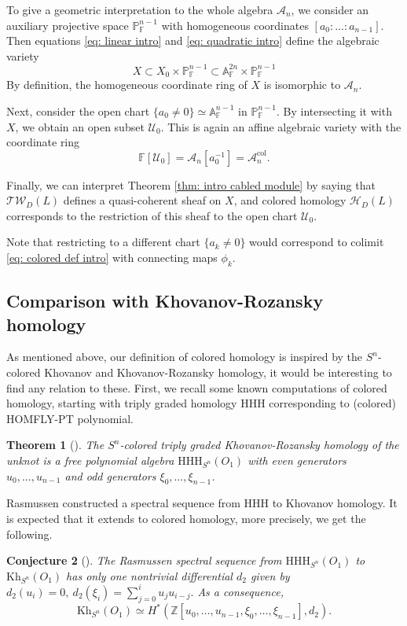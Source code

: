 \documentclass{amsart}
\newtheorem{theorem}{Theorem}[section]
\newtheorem{conjecture}[theorem]{Conjecture}
\newcommand{\Kh}{\mathrm{Kh}}
\newcommand{\CA}{\mathcal{A}}
\newcommand{\col}{\mathrm{col}}
\newcommand{\Tw}{\mathcal{TW}}
\newcommand{\F}{\mathbb{F}}
\newcommand{\HD}{\mathcal{H}}
\newcommand{\HHH}{\mathrm{HHH}}
\newcommand{\Z}{\mathbb{Z}}
\begin{document}
To give a geometric interpretation to the whole algebra $\CA_n$, we consider an auxiliary projective space $\mathbb{P}^{n-1}_{\F}$ with homogeneous coordinates $[a_0:\ldots:a_{n-1}]$. Then  equations \eqref{eq: linear intro} and \eqref{eq: quadratic intro} define the algebraic variety
$$
X\subset X_0\times \mathbb{P}^{n-1}_{\F}\subset \mathbb{A}^{2n}_{\F}\times \mathbb{P}^{n-1}_{\F}
$$
By definition, the homogeneous coordinate ring of $X$ is isomorphic to $\CA_n$.

Next, consider the open chart $\{a_0\neq 0\}\simeq \mathbb{A}^{n-1}_{\F}$ in $\mathbb{P}^{n-1}_{\F}$. By intersecting it with  $X$, we obtain an open subset $\mathcal{U}_0$. This is again an affine algebraic variety with the coordinate ring
$$
\F[\mathcal{U}_0]=\CA_n[a_0^{-1}]=\CA_n^{\col}.
$$
 
Finally, we can interpret Theorem \ref{thm: intro cabled module} by saying that $\Tw_D(L)$ defines a quasi-coherent sheaf on $X$, and colored homology $\HD_{D}(L)$ corresponds to the restriction of this sheaf to the open chart $\mathcal{U}_0.$ 

Note that restricting to a different chart $\{a_k\neq 0\}$ would correspond to colimit \eqref{eq: colored def intro} with connecting maps $\phi_k$.

\subsection{Comparison with Khovanov-Rozansky homology}
\label{sec: HY comparison}

As mentioned above, our definition of colored homology is inspired by the $S^n$-colored Khovanov and Khovanov-Rozansky homology, it would be interesting to find any relation to these.
First, we recall some known computations of colored homology, starting with  triply graded homology $\HHH$ corresponding to (colored) HOMFLY-PT polynomial.

\begin{theorem}[\cite{Hogancamp}]
 The $S^n$-colored triply graded Khovanov-Rozansky homology of the unknot  is a free polynomial algebra $\HHH_{S^n}(O_1)$ with even generators  $u_0,\ldots,u_{n-1}$ and odd generators $\xi_0,\ldots,\xi_{n-1}$.
\end{theorem}

Rasmussen \cite{RasDiff} constructed a spectral sequence from $\HHH$ to Khovanov homology. It is expected that it extends to colored homology, more precisely, we get the following.

\begin{conjecture}[\cite{GOR}]
The Rasmussen spectral sequence from $\HHH_{S^n}(O_1)$ to $\Kh_{S^n}(O_1)$ has only one nontrivial differential $d_2$ given by
$
d_2(u_i)=0,\ d_2(\xi_i)=\sum_{j=0}^{i}u_ju_{i-j}.
$
As a consequence,
$$
\Kh_{S^n}(O_1)\simeq H^*
\left(\Z[u_0,\ldots,u_{n-1},\xi_0,\ldots,\xi_{n-1}],d_2\right).
$$
\end{conjecture}
\end{document}

